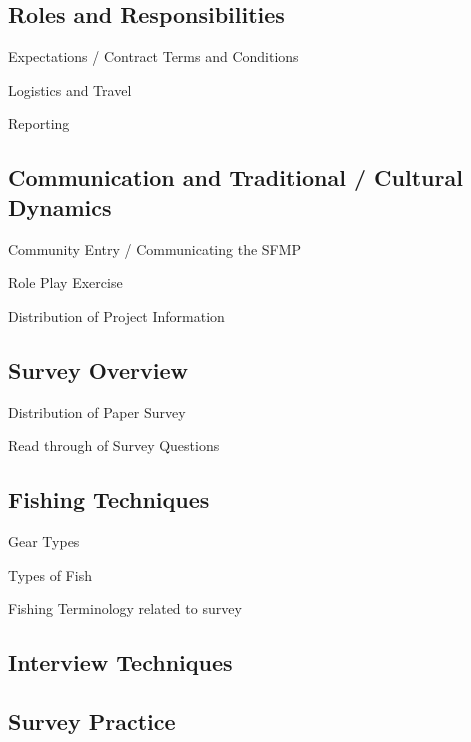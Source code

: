 \documentclass[a4paper,agenda,11pt]{meetingmins}
\begin{document}
\subsection{Roles and Responsibilities}
\begin{subitems}
\item Expectations / Contract Terms and Conditions
\item Logistics and Travel
\item Reporting
\end{subitems}

\subsection{Communication and Traditional / Cultural Dynamics}
\begin{subitems}
\item Community Entry / Communicating the SFMP
\item Role Play Exercise
\item Distribution of Project Information
\end{subitems}

\subsection{Survey Overview}
\begin{subitems}
\item Distribution of Paper Survey
\item Read through of Survey Questions
\end{subitems}

\subsection{Fishing Techniques}
\begin{subitems}
\item Gear Types
\item Types of Fish
\item Fishing Terminology related to survey
\end{subitems}

\subsection{Interview Techniques}

\subsection{Survey Practice}
\end{document}
